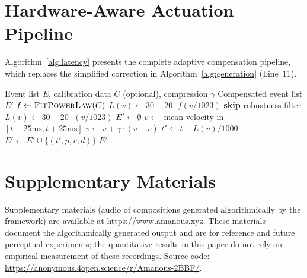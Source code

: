 \documentclass[a4paper]{article}
\theoremstyle{definition}
\theoremstyle{remark}
\begin{document}
\section{Hardware-Aware Actuation Pipeline}
\label{app:algorithm}

Algorithm~\ref{alg:latency} presents the complete adaptive compensation pipeline, which replaces the simplified correction in Algorithm~\ref{alg:generation} (Line~11).

\begin{algorithm}[htbp]
\caption{Hardware-Aware Actuation Pipeline (HAL)}
\label{alg:latency}
\begin{algorithmic}[1]
\Require Event list $E$, calibration data $C$ (optional), compression $\gamma$
\Ensure Compensated event list $E'$
    \State $f \gets \textsc{FitPowerLaw}(C)$ 
    \State $L(v) \gets 30 - 20 \cdot f(v/1023)$
    \State \textbf{skip} robustness filter
\Else
    \State $L(v) \gets 30 - 20 \cdot (v/1023)$ 
\EndIf
\State $E' \gets \emptyset$
        \State $\bar{v} \gets$ mean velocity in $[t-25\text{ms}, t+25\text{ms}]$
        \State $v \gets \bar{v} + \gamma \cdot (v - \bar{v})$ 
    \EndIf
    \State $t' \gets t - L(v)/1000$
    \State $E' \gets E' \cup \{(t', p, v, d)\}$
\EndFor
\State \Return $E'$
\end{algorithmic}
\end{algorithm}


\section{Supplementary Materials}
\label{app:supplementary}

Supplementary materials (audio of compositions generated algorithmically by the framework) are available at \url{https://www.amanous.xyz}. These materials document the algorithmically generated output and are for reference and future perceptual experiments; the quantitative results in this paper do not rely on empirical measurement of these recordings. Source code: \url{https://anonymous.4open.science/r/Amanous-2BBF/}.
\end{document}
